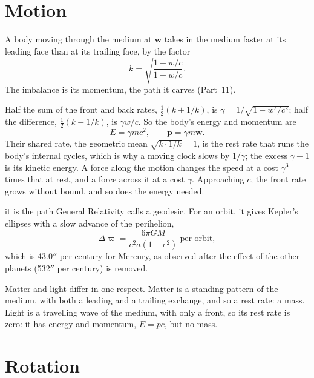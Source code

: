 \documentclass[11pt,a4paper]{article}
\begin{document}
\section{Motion}
\label{sec:motion}

\begin{hypbar}
A body moving through the medium at $\mathbf{w}$ takes in the medium faster at its leading face than at its trailing face, by the factor
\begin{equation}
k = \sqrt{\frac{1+w/c}{1-w/c}}.
\end{equation}
The imbalance is its momentum, the path it carves (Part~11).
\end{hypbar}

 Half the sum of the front and back rates, $\tfrac12(k + 1/k)$, is $\gamma = 1/\sqrt{1-w^2/c^2}$; half the difference, $\tfrac12(k - 1/k)$, is $\gamma w/c$. So the body's energy and momentum are
\begin{equation}
E = \gamma m c^2, \qquad \mathbf{p} = \gamma m \mathbf{w}.
\end{equation}
Their shared rate, the geometric mean $\sqrt{k \cdot 1/k} = 1$, is the rest rate that runs the body's internal cycles, which is why a moving clock slows by $1/\gamma$; the excess $\gamma - 1$ is its kinetic energy. A force along the motion changes the speed at a cost $\gamma^3$ times that at rest, and a force across it at a cost $\gamma$. Approaching $c$, the front rate grows without bound, and so does the energy needed.

 it is the path General Relativity calls a geodesic. For an orbit, it gives Kepler's ellipses with a slow advance of the perihelion,
\begin{equation}
\Delta\varpi = \frac{6\pi GM}{c^2 a (1-e^2)} \ \text{per orbit},
\end{equation}
which is 43.0$''$ per century for Mercury, as observed after the effect of the other planets (532$''$ per century) is removed.

Matter and light differ in one respect. Matter is a standing pattern of the medium, with both a leading and a trailing exchange, and so a rest rate: a mass. Light is a travelling wave of the medium, with only a front, so its rest rate is zero: it has energy and momentum, $E = pc$, but no mass.

\section{Rotation}
\label{sec:rotation}
\end{document}
